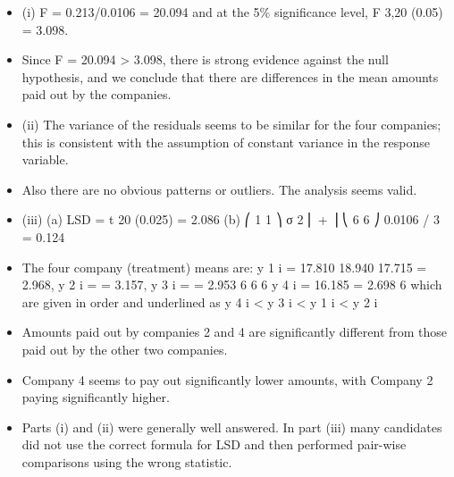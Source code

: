 \documentclass[a4paper,12pt]{article}
\begin{document}
\begin{itemize}
\item (i) F = 0.213/0.0106 = 20.094 and at the 5\% significance level,
F 3,20 (0.05) = 3.098.
\item Since F = 20.094 > 3.098, there is strong evidence against the null hypothesis, and we conclude that there are differences in the mean amounts paid out by the companies.
\item (ii) The variance of the residuals seems to be similar for the four companies; this is consistent with the assumption of constant variance in the response variable.
\item Also there are no obvious patterns or outliers. The analysis seems valid.
\item (iii) (a)
LSD = t 20 (0.025)
= 2.086
(b)
⎛ 1 1 ⎞
σ 2 ⎜ + ⎟
⎝ 6 6 ⎠
0.0106 / 3 = 0.124
\item The four company (treatment) means are:
y 1 i = 17.810
18.940
17.715
= 2.968, y 2 i =
= 3.157, y 3 i =
= 2.953
6
6
6
y 4 i = 16.185
= 2.698
6
which are given in order and underlined as
y 4 i < y 3 i < y 1 i < y 2 i
\item Amounts paid out by companies 2 and 4 are significantly different from those paid out by the other two companies. 
\item Company 4 seems to pay out significantly lower amounts, with Company 2 paying
significantly higher.
\item Parts (i) and (ii) were generally well answered. In part (iii) many candidates did not use the
correct formula for LSD and then performed pair-wise comparisons using the wrong statistic.
\end{itemize}
\end{document}
